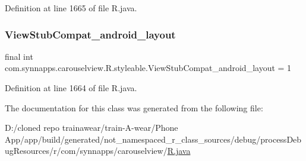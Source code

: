 Definition at line 1665 of file R.\+java.

\mbox{\label{classcom_1_1synnapps_1_1carouselview_1_1_r_1_1styleable_af546e3478608ea69370c5a3dec545a95}} 
\subsubsection{\texorpdfstring{ViewStubCompat\_android\_layout}{ViewStubCompat\_android\_layout}}
{\footnotesize\ttfamily final int com.\+synnapps.\+carouselview.\+R.\+styleable.\+View\+Stub\+Compat\+\_\+android\+\_\+layout = 1\hspace{0.3cm}{\ttfamily [static]}}



Definition at line 1664 of file R.\+java.



The documentation for this class was generated from the following file\+:\begin{DoxyCompactItemize}
\item 
D\+:/cloned repo trainawear/train-\/\+A-\/wear/\+Phone App/app/build/generated/not\+\_\+namespaced\+\_\+r\+\_\+class\+\_\+sources/debug/process\+Debug\+Resources/r/com/synnapps/carouselview/\mbox{\hyperlink{process_debug_resources_2r_2com_2synnapps_2carouselview_2_r_8java}{R.\+java}}\end{DoxyCompactItemize}
